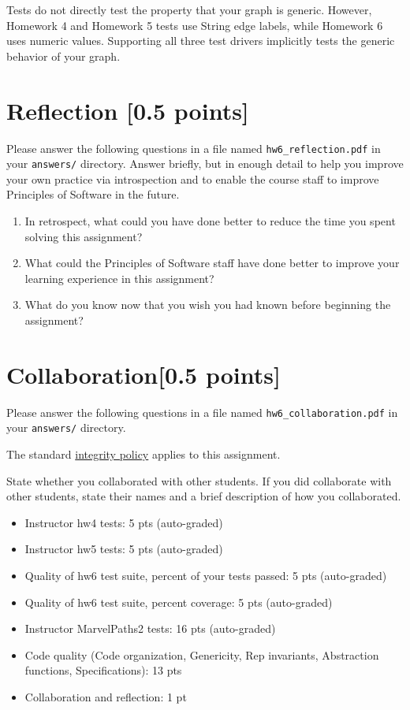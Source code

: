 \documentclass[11pt]{article}
\begin{document}
\noindent Tests do not directly test the property that your graph is generic. However, Homework 4 and Homework 5 tests use String edge labels, while Homework 6 uses numeric values. Supporting all three test drivers implicitly tests the generic behavior of your graph.

\section*{Reflection [0.5 points]}
Please answer the following questions in a file named \texttt{hw6\_reflection.pdf} in your \texttt{answers/} directory. Answer briefly, but in enough detail to help you improve your own practice via introspection and to enable the course staff to improve Principles of Software in the future.
\begin{enumerate}
\item In retrospect, what could you have done better to reduce the time you spent solving this assignment?
\item What could the Principles of Software staff have done better to improve your learning experience in this assignment?
\item What do you know now that you wish you had known before beginning the assignment?
\end{enumerate}

\section*{Collaboration[0.5 points]}
Please answer the following questions in a file named \texttt{hw6\_collaboration.pdf} in your \texttt{answers/} directory.

\noindent The standard \href{https://www.cs.rpi.edu/academics/courses/spring23/csci2600/Documents/syllabus_CSCI_2600_Spring_2023.pdf}{integrity policy} applies to this assignment.

\noindent State whether you collaborated with other students. If you did collaborate with other students, state their names and a brief description of how you collaborated.

\begin{itemize}
\item Instructor hw4 tests: 5 pts (auto-graded)
\item Instructor hw5 tests: 5 pts (auto-graded)
\item Quality of hw6 test suite, percent of your tests passed: 5 pts (auto-graded)
\item Quality of hw6 test suite, percent coverage: 5 pts (auto-graded)
\item Instructor MarvelPaths2 tests: 16 pts (auto-graded)
\item Code quality (Code organization, Genericity, Rep invariants, Abstraction functions, Specifications): 13 pts
\item Collaboration and reflection: 1 pt
\end{itemize}
\end{document}
